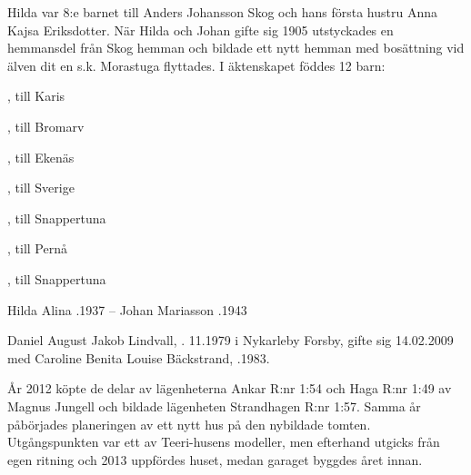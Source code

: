 Hilda var 8:e barnet till Anders Johansson Skog och hans första hustru Anna Kajsa Eriksdotter. När Hilda och Johan gifte sig 1905 utstyckades en hemmansdel från Skog hemman och bildade ett nytt hemman med bosättning vid älven dit en s.k. Morastuga flyttades. I äktenskapet föddes 12 barn:
\begin{jhchildren}
  \item {}
  \item {}
  \item {}
  \item {}, till Karis
  \item {}
  \item {}, till Bromarv
  \item {}, till Ekenäs
  \item {}, till Sverige
  \item {}, till Snappertuna
  \item {}
  \item {}, till Pernå
  \item {}, till Snappertuna
\end{jhchildren}

Hilda Alina .1937  --   Johan Mariasson .1943




Daniel August Jakob Lindvall, . 11.1979 i Nykarleby Forsby, gifte sig 14.02.2009 med Caroline Benita Louise Bäckstrand, .1983.



År 2012 köpte de delar av lägenheterna Ankar R:nr 1:54 och Haga R:nr 1:49 av Magnus Jungell och bildade lägenheten Strandhagen R:nr 1:57. Samma år påbörjades planeringen av ett nytt hus på den nybildade tomten. Utgångspunkten var ett av Teeri-husens modeller, men efterhand utgicks från egen ritning och 2013 uppfördes huset, medan garaget byggdes året innan.

